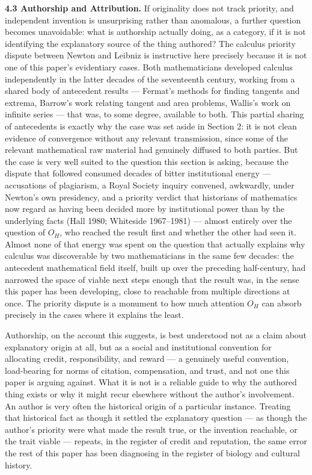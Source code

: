 \documentclass[11pt]{article}
\theoremstyle{plain}
\begin{document}
\textbf{4.3 Authorship and Attribution.} If originality does not track priority, and independent invention is unsurprising rather than anomalous, a further question becomes unavoidable: what is authorship actually doing, as a category, if it is not identifying the explanatory source of the thing authored? The calculus priority dispute between Newton and Leibniz is instructive here precisely because it is not one of this paper's evidentiary cases. Both mathematicians developed calculus independently in the latter decades of the seventeenth century, working from a shared body of antecedent results --- Fermat's methods for finding tangents and extrema, Barrow's work relating tangent and area problems, Wallis's work on infinite series --- that was, to some degree, available to both. This partial sharing of antecedents is exactly why the case was set aside in Section 2: it is not clean evidence of convergence without any relevant transmission, since some of the relevant mathematical raw material had genuinely diffused to both parties. But the case is very well suited to the question this section is asking, because the dispute that followed consumed decades of bitter institutional energy --- accusations of plagiarism, a Royal Society inquiry convened, awkwardly, under Newton's own presidency, and a priority verdict that historians of mathematics now regard as having been decided more by institutional power than by the underlying facts (Hall 1980; Whiteside 1967--1981) --- almost entirely over the question of \(O_H\), who reached the result first and whether the other had seen it. Almost none of that energy was spent on the question that actually explains why calculus was discoverable by two mathematicians in the same few decades: the antecedent mathematical field itself, built up over the preceding half-century, had narrowed the space of viable next steps enough that the result was, in the sense this paper has been developing, close to reachable from multiple directions at once. The priority dispute is a monument to how much attention \(O_H\) can absorb precisely in the cases where it explains the least.

Authorship, on the account this suggests, is best understood not as a claim about explanatory origin at all, but as a social and institutional convention for allocating credit, responsibility, and reward --- a genuinely useful convention, load-bearing for norms of citation, compensation, and trust, and not one this paper is arguing against. What it is not is a reliable guide to why the authored thing exists or why it might recur elsewhere without the author's involvement. An author is very often the historical origin of a particular instance. Treating that historical fact as though it settled the explanatory question --- as though the author's priority were what made the result true, or the invention reachable, or the trait viable --- repeats, in the register of credit and reputation, the same error the rest of this paper has been diagnosing in the register of biology and cultural history.
\end{document}
